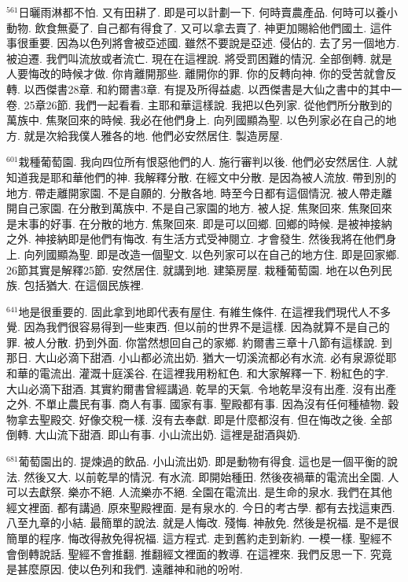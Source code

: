 \documentclass{book}
\begin{document}
$^{561}$日曬雨淋都不怕.
又有田耕了.
即是可以計劃一下.
何時賣農產品.
何時可以養小動物.
飲食無憂了.
自己都有得食了.
又可以拿去賣了.
神更加賜給他們國土.
這件事很重要.
因為以色列將會被亞述國.
雖然不要說是亞述.
侵佔的.
去了另一個地方.
被迫遷.
我們叫流放或者流亡.
現在在這裡說.
將受罰困難的情況.
全部倒轉.
就是人要悔改的時候才做.
你肯離開那些.
離開你的罪.
你的反轉向神.
你的受苦就會反轉.
以西傑書28章.
和約爾書3章.
有提及所得益處.
以西傑書是大仙之書中的其中一卷.
25章26節.
我們一起看看.
主耶和華這樣說.
我把以色列家.
從他們所分散到的萬族中.
焦聚回來的時候.
我必在他們身上.
向列國顯為聖.
以色列家必在自己的地方.
就是次給我僕人雅各的地.
他們必安然居住.
製造房屋.

$^{601}$栽種葡萄園.
我向四位所有恨惡他們的人.
施行審判以後.
他們必安然居住.
人就知道我是耶和華他們的神.
我解釋分散.
在經文中分散.
是因為被人流放.
帶到別的地方.
帶走離開家園.
不是自願的.
分散各地.
時至今日都有這個情況.
被人帶走離開自己家園.
在分散到萬族中.
不是自己家園的地方.
被人捉.
焦聚回來.
焦聚回來是末事的好事.
在分散的地方.
焦聚回來.
即是可以回鄉.
回鄉的時候.
是被神接納之外.
神接納即是他們有悔改.
有生活方式受神閱立.
才會發生.
然後我將在他們身上.
向列國顯為聖.
即是改造一個聖文.
以色列家可以在自己的地方住.
即是回家鄉.
26節其實是解釋25節.
安然居住.
就講到地.
建築房屋.
栽種葡萄園.
地在以色列民族.
包括猶大.
在這個民族裡.

$^{641}$地是很重要的.
固此拿到地即代表有屋住.
有維生條件.
在這裡我們現代人不多覺.
因為我們很容易得到一些東西.
但以前的世界不是這樣.
因為就算不是自己的罪.
被人分散.
扔到外面.
你當然想回自己的家鄉.
約爾書三章十八節有這樣說.
到那日.
大山必滴下甜酒.
小山都必流出奶.
猶大一切溪流都必有水流.
必有泉源從耶和華的電流出.
灌溉十庭溪谷.
在這裡我用粉紅色.
和大家解釋一下.
粉紅色的字.
大山必滴下甜酒.
其實約爾書曾經講過.
乾旱的天氣.
令地乾旱沒有出產.
沒有出產之外.
不單止農民有事.
商人有事.
國家有事.
聖殿都有事.
因為沒有任何種植物.
穀物拿去聖殿交.
好像交稅一樣.
沒有去奉獻.
即是什麼都沒有.
但在悔改之後.
全部倒轉.
大山流下甜酒.
即山有事.
小山流出奶.
這裡是甜酒與奶.

$^{681}$葡萄園出的.
提煉過的飲品.
小山流出奶.
即是動物有得食.
這也是一個平衡的說法.
然後又大.
以前乾旱的情況.
有水流.
即開始種田.
然後夜禍華的電流出全園.
人可以去獻祭.
樂亦不絕.
人流樂亦不絕.
全園在電流出.
是生命的泉水.
我們在其他經文裡面.
都有講過.
原來聖殿裡面.
是有泉水的.
今日的考古學.
都有去找這東西.
八至九章的小結.
最簡單的說法.
就是人悔改.
殘悔.
神赦免.
然後是祝福.
是不是很簡單的程序.
悔改得赦免得祝福.
這方程式.
走到舊約走到新約.
一模一樣.
聖經不會倒轉說話.
聖經不會推翻.
推翻經文裡面的教導.
在這裡來.
我們反思一下.
究竟是甚麼原因.
使以色列和我們.
遠離神和祂的吩咐.
\end{document}
